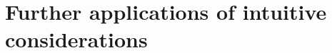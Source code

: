 \paragraph{} %

\paragraph{} %

\section{Further applications of intuitive considerations}

\paragraph{} %

\paragraph{} %

\paragraph{} %

\paragraph{} %

\paragraph{} %

\paragraph{} %

\paragraph{} %

\paragraph{} %

\paragraph{} %

